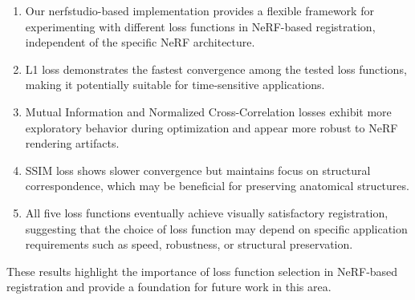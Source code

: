 \begin{enumerate}
    \item Our nerfstudio-based implementation provides a flexible framework for experimenting with different loss functions in NeRF-based registration, independent of the specific NeRF architecture.
    
    \item L1 loss demonstrates the fastest convergence among the tested loss functions, making it potentially suitable for time-sensitive applications.
    
    \item Mutual Information and Normalized Cross-Correlation losses exhibit more exploratory behavior during optimization and appear more robust to NeRF rendering artifacts.
    
    \item SSIM loss shows slower convergence but maintains focus on structural correspondence, which may be beneficial for preserving anatomical structures.
    
    \item All five loss functions eventually achieve visually satisfactory registration, suggesting that the choice of loss function may depend on specific application requirements such as speed, robustness, or structural preservation.
\end{enumerate}

These results highlight the importance of loss function selection in NeRF-based registration and provide a foundation for future work in this area. 